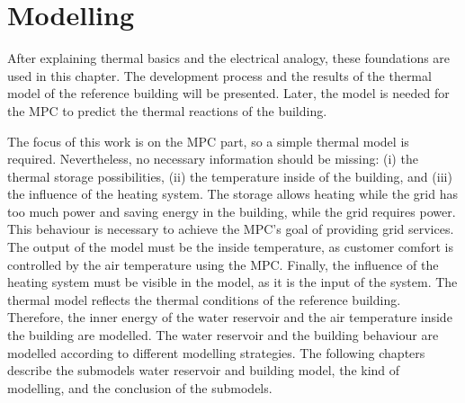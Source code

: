 \chapter{Modelling}
\label{ch:modelling}
After explaining thermal basics and the electrical analogy, these foundations are used in this chapter. The development process and the results of the thermal model of the reference building will be presented. Later, the model is needed for the MPC to predict the thermal reactions of the building.
\newline
    
    The focus of this work is on the MPC part, so a simple thermal model is required. Nevertheless, no necessary information should be missing: (i) the thermal storage possibilities, (ii) the temperature inside of the building, and (iii) the influence of the heating system. The storage allows heating while the grid has too much power and saving energy in the building, while the grid requires power. This behaviour is necessary to achieve the MPC's goal of providing grid services. The output of the model must be the inside temperature, as customer comfort is controlled by the air temperature using the MPC. Finally, the influence of the heating system must be visible in the model, as it is the input of the system.
    \newline
    The thermal model reflects the thermal conditions of the reference building. Therefore, the inner energy of the water reservoir and the air temperature inside the building are modelled. The water reservoir and the building behaviour are modelled according to different modelling strategies. The following chapters describe the submodels water reservoir and building model, the kind of modelling, and the conclusion of the submodels.
    
